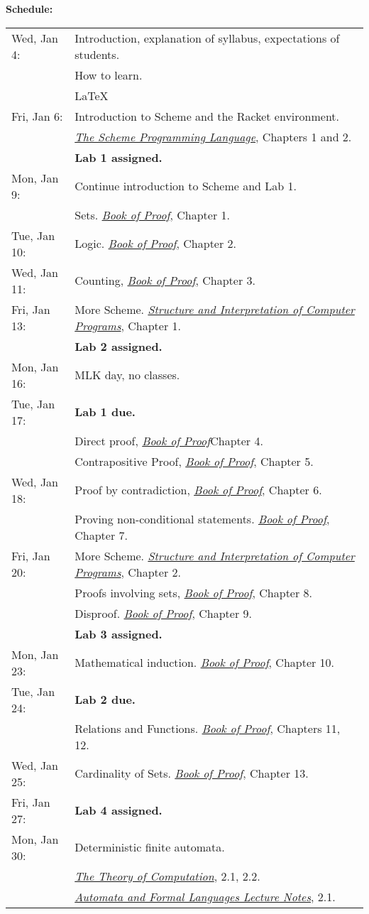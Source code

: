 \documentclass{article}
\newcommand{\bop}
           {\href{http://www.people.vcu.edu/~rhammack/BookOfProof/}
             {{\em      Book    of Proof}}}
\newcommand{\spl}
           {\href{http://www.scheme.com/tspl3/}
             {{\em The Scheme Programming Language}}}
\newcommand{\sicp}           
           {\href{https://mitpress.mit.edu/sicp/}
             {{\em Structure and Interpretation of Computer Programs}}}
\newcommand{\theory}
           {\href{http://cg.scs.carleton.ca/~michiel/TheoryOfComputation/}
             {{\em The Theory of Computation}}}
\newcommand{\automata}
           {\href{http://users.utu.fi/jkari/automata/}
             {{\em Automata and Formal Languages Lecture Notes}}}
\begin{document}
  
{\bf Schedule:}

\begin{longtable}{ll}
Wed, Jan 4:
&   Introduction, explanation of syllabus, expectations of students.
\\&   How to learn.
\\&   \LaTeX
\\
Fri, Jan 6: 
&  Introduction to Scheme and the Racket environment.
\\& \spl, Chapters 1 and 2.
\\ &  {\bf Lab 1 assigned.}
\\\hline
Mon, Jan 9:
& Continue introduction to Scheme and Lab 1.
\\&  Sets. \bop, Chapter 1.
\\
Tue, Jan 10:
& Logic. \bop, Chapter  2.
\\
Wed, Jan 11:
&  Counting, \bop, Chapter 3.
\\
Fri, Jan 13:
& More Scheme. \sicp, Chapter 1.
\\&  {\bf Lab 2 assigned.} 
\\\hline
Mon, Jan 16:&  MLK day, no classes.
\\
Tue, Jan 17:
& {\bf Lab 1 due.}
\\&  Direct proof, \bop Chapter 4.
\\&   Contrapositive Proof, \bop, Chapter 5.
\\
Wed, Jan 18:
& Proof by contradiction, \bop, Chapter 6.
\\& Proving non-conditional statements. \bop, Chapter 7.
\\
Fri, Jan 20:
& More Scheme.   \sicp, Chapter 2.
\\&  Proofs involving sets, \bop, Chapter 8.
\\& Disproof. \bop, Chapter 9.
\\& {\bf Lab 3 assigned.}
\\\hline
Mon, Jan 23:
& Mathematical induction.  \bop, Chapter 10.
\\
Tue, Jan 24:
& {\bf Lab 2 due.}
\\&  Relations and Functions.   \bop, Chapters 11, 12.
\\
Wed, Jan 25:
& Cardinality of Sets.  \bop, Chapter 13.
\\
Fri, Jan 27:
& {\bf Lab 4 assigned.}
\\\hline
Mon, Jan 30:
& Deterministic finite automata.
\\&\theory, 2.1, 2.2.
\\&\automata,    2.1.
\\

\end{longtable}
\end{document}
